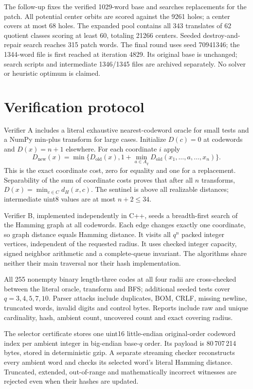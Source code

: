 \documentclass[11pt]{article}
\begin{document}
The follow-up fixes the verified 1029-word base and searches replacements for
the patch. All potential center orbits are scored against the 9261 holes; a
center covers at most 68 holes. The expanded pool contains all 343 translates
of 62 quotient classes scoring at least 60, totaling 21266 centers. Seeded
destroy-and-repair search reaches 315 patch words. The final round uses seed
70941346; the 1344-word file is first reached at iteration 4829. Its
original base is unchanged; search scripts and intermediate 1346/1345 files
are archived separately. No solver or heuristic optimum is claimed.

\section{Verification protocol}
Verifier A includes a literal exhaustive nearest-codeword oracle for small tests
and a NumPy min-plus transform for large cases. Initialize $D(c)=0$ at codewords
and $D(x)=n+1$ elsewhere. For each coordinate $i$ apply
\[
D_{\mathrm{new}}(x)=\min\{D_{\mathrm{old}}(x),
 1+\min_{a\in A_q}D_{\mathrm{old}}(x_1,\ldots,a,\ldots,x_n)\}.
\]
This is the exact coordinate cost, zero for equality and one for a replacement.
Separability of the sum of coordinate costs proves that after all $n$ transforms,
$D(x)=\min_{c\in C}d_H(x,c)$. The sentinel is above all realizable distances;
intermediate uint8 values are at most $n+2\le34$.

Verifier B, implemented independently in C++, seeds a breadth-first search of
the Hamming graph at all codewords. Each edge changes exactly one coordinate,
so graph distance equals Hamming distance. It visits all $q^n$ packed integer
vertices, independent of the requested radius. It uses checked integer capacity,
signed neighbor arithmetic and a complete-queue invariant. The algorithms share
neither their main traversal nor their hash implementation.

All 255 nonempty binary length-three codes at all four radii are cross-checked
between the literal oracle, transform and BFS; additional seeded tests cover
$q=3,4,5,7,10$. Parser attacks include duplicates, BOM, CRLF, missing newline,
truncated words, invalid digits and control bytes. Reports include raw and unique
cardinality, hash, ambient count, uncovered count and exact covering radius.

The selector certificate stores one uint16 little-endian original-order codeword
index per ambient integer in big-endian base-$q$ order. Its payload is
80\,707\,214 bytes, stored in deterministic gzip. A separate streaming checker
reconstructs every ambient word and checks its selected word's literal Hamming
distance. Truncated, extended, out-of-range and mathematically incorrect witnesses
are rejected even when their hashes are updated.
\end{document}
